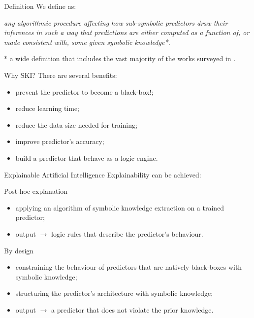 \documentclass[presentation]{beamer}\mode<presentation>{\usetheme{AMSBolognaFC}}
\begin{document}
\begin{frame}[allowframebreaks]{Definition}
    We define \longski{} as:
    \begin{displayquote}\itshape
        any \emph{algorithmic} procedure affecting how \alert{sub-symbolic predictors} draw their inferences in such a way that predictions are either \emph{computed} as a function of, or made \emph{consistent} with, some \emph{given} \alert{symbolic knowledge}*.
    \end{displayquote}
    \vfill
    * a wide definition that includes the vast majority of the works surveyed in \cite{surveyNeuroSymb,surveyXie,surveyCalegariCO20}.
    
\end{frame}


\begin{frame}[c]{Why SKI?}
    There are several benefits:
    \begin{itemize}
        \item prevent the predictor to become a black-box\alert{!};
        \item reduce learning time;
        \item reduce the data size needed for training;
        \item improve predictor's accuracy;
        \item build a predictor that behave as a logic engine.
    \end{itemize}
\end{frame}

\begin{frame}[c]{Explainable Artificial Intelligence }
    Explainability can be achieved:
    \begin{block}{Post-hoc explanation}
        \begin{itemize}
            \item applying an algorithm of symbolic knowledge extraction on a trained predictor;
            \item output $\rightarrow$ logic rules that describe the predictor's behaviour.
        \end{itemize}    
    \end{block}
    
    \begin{block}{By design}
        \begin{itemize}
            \item constraining the behaviour of predictors that are natively black-boxes with symbolic knowledge;
            \item structuring the predictor's architecture with symbolic knowledge;
            \item output $\rightarrow$ a predictor that does not violate the prior knowledge.
        \end{itemize}
    \end{block}
    
\end{frame}
\end{document}
